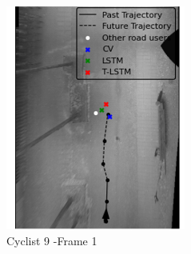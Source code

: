 \documentclass{article}
\begin{document}
\begin{figure}[H]
\centering
\begin{subfigure}{0.4\textwidth}
  \centering
  \includegraphics[width=\linewidth]{quali_results/cyc-9-1.png}
  \caption{Cyclist 9 -Frame 1}
  \label{fig:cyc9-1}
\end{subfigure}
\begin{subfigure}{0.4\textwidth}
  \centering

\end{subfigure}
\end{figure}
\end{document}
